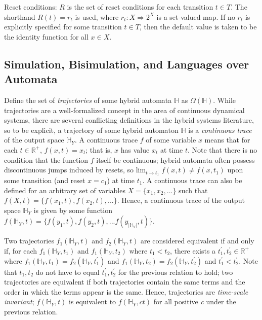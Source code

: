 Reset conditions: $R$ is the set of reset conditions for each transition $t \in T$. The shorthand $R(t) = r_t$ is used, where $r_t : X \Rightarrow 2^X$ is a set-valued map. If no $r_t$ is explicitly specified for some transition $t \in T$, then the default value is taken to be the identity function for all $x \in X$.

\subsection{Simulation, Bisimulation, and Languages over Automata}

Define the set of \textit{trajectories} of some hybrid automata $\mathbb{H}$ as $\Omega(\mathbb{H})$. While trajectories are a well-formalized concept in the area of continuous dynamical systems, there are several conflicting definitions in the hybrid systems literature, so to be explicit, a trajectory of some hybrid automaton $\mathbb{H}$ is a \textit{continuous trace} of the output space $\mathbb{H}_Y$. A continuous trace $f$ of some variable $x$ means that for each $t \in \mathbb{R}^+$, $f(x,t) = x_t$; that is, $x$ has value $x_t$ at time $t$. Note that there is no condition that the function $f$ itself be continuous; hybrid automata often possess discontinuous jumps induced by resets, so $\text{lim}_{t \rightarrow t_1} \; f(x, t) \neq f(x, t_1)$ upon some transition (and reset $x = c_1$) at time $t_1$.  A continuous trace can also be defined for an arbitrary set of variables $X = \{ x_1, x_2, ... \}$ such that $f(X,t) = \{ f(x_1, t), f(x_2, t), ... \}$. Hence, a continuous trace of the output space $\mathbb{H}_Y$ is given by some function $f(\mathbb{H}_Y, t) = \{ f(y_1, t), f(y_2, t), ... f(y_{|\mathbb{H}_Y|}, t) \}$. 

Two trajectories $f_1(\mathbb{H}_Y, t)$ and $f_2(\mathbb{H}_Y, t)$ are considered equivalent if and only if, for each $f_1(\mathbb{H}_Y, t_1)$ and $f_1(\mathbb{H}_Y, t_2)$ where $t_1 < t_2$, there exists a $t^{'}_1 , t^{'}_2 \in \mathbb{R}^+$ where $f_1(\mathbb{H}_Y, t_1) = f_2(\mathbb{H}_Y, t^{'}_1)$ and $f_1(\mathbb{H}_Y, t_2) = f_2(\mathbb{H}_Y, t^{'}_2)$ and $t^{'}_1 < t^{'}_2$. Note that $t_1, t_2$ do not have to equal $t^{'}_1 , t^{'}_2$ for the previous relation to hold; two trajectories are equivalent if both trajectories contain the same terms and the order in which the terms appear is the same. Hence, trajectories are \textit{time-scale invariant}; $f(\mathbb{H}_Y, t)$ is equivalent to $f(\mathbb{H}_Y, ct)$ for all positive \textit{c} under the previous relation. 

